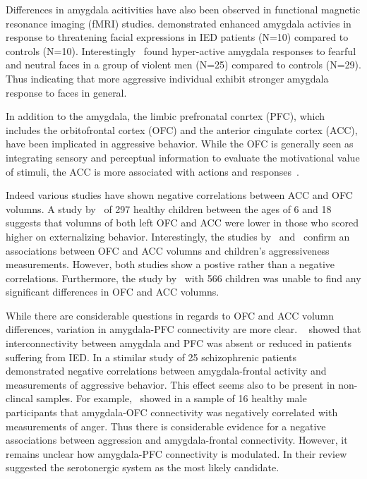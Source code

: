 Differences in amygdala acitivities have also been observed in functional magnetic resonance imaging (fMRI) studies.
\citet{Coccaro2007} demonstrated enhanced amygdala activies in response to threatening facial expressions in IED patients (N=10) compared to controls (N=10).
Interestingly~\citet{Bobes2013} found hyper-active amygdala responses to fearful and neutral faces in a group of violent men (N=25) compared to controls (N=29). 
Thus indicating that more aggressive individual exhibit stronger amygdala response to faces in general.

In addition to the amygdala, the limbic prefronatal conrtex (PFC), which includes the orbitofrontal cortex (OFC) and the anterior cingulate cortex (ACC), have been implicated in aggressive behavior.
While the OFC is generally seen as integrating sensory and perceptual information to evaluate the motivational value of stimuli, the ACC is more associated with actions and responses~\cite{Rudebeck2014,Walton2007}.

Indeed various studies have shown negative correlations between ACC and OFC volumns.
A study by~\citet{Ameis2014} of 297 healthy children between the ages of 6 and 18 suggests that volumns of both left OFC and ACC were lower in those who scored higher on externalizing behavior.
Interestingly, the studies by~\citet{Ducharme2011} and~\citet{Boes2008} confirm an associations between OFC and ACC volumns and children's aggressiveness measurements.
However, both studies show a postive rather than a negative correlations.
Furthermore, the study by~\citet{Thijssen2015} with 566 children was unable to find any significant differences in OFC and ACC volumns.

While there are considerable questions in regards to OFC and ACC volumn differences, variation in amygdala-PFC connectivity are more clear.
~\citet{Coccaro2007} showed that interconnectivity between amygdala and PFC was absent or reduced in patients suffering from IED.
In a stimilar study of 25 schizophrenic patients~\citet{Hoptman2010} demonstrated negative correlations between amygdala-frontal activity and measurements of aggressive behavior.
This effect seems also to be present in non-clincal samples.
For example,~\citet{Fulwiler2012} showed in a sample of 16 healthy male participants that amygdala-OFC connectivity was negatively correlated with measurements of anger. 
Thus there is considerable evidence for a negative associations between aggression and amygdala-frontal connectivity.
However, it remains unclear how amygdala-PFC connectivity is modulated.
In their review~\citet{Rosell2015} suggested the serotonergic system as the most likely candidate.

